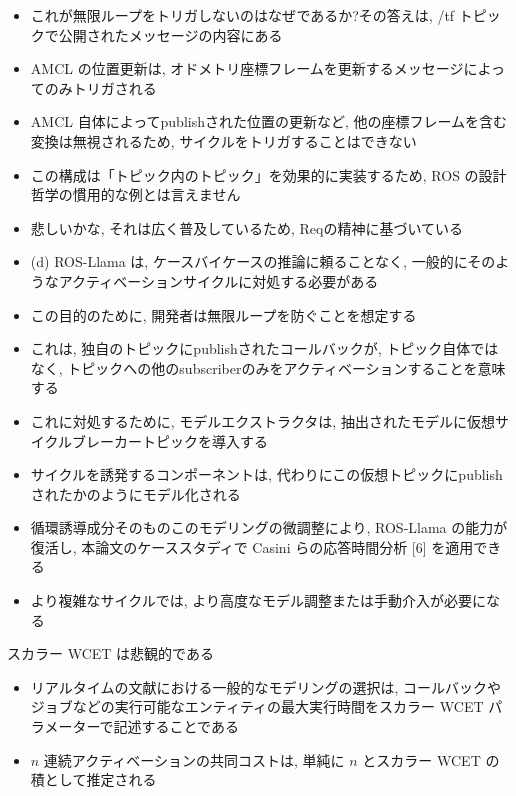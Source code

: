 \begin{frame}{}
    \begin{itemize}
        \item これが無限ループをトリガしないのはなぜであるか?その答えは, /tf トピックで公開されたメッセージの内容にある
\item AMCL の位置更新は, オドメトリ座標フレームを更新するメッセージによってのみトリガされる
\item AMCL 自体によってpublishされた位置の更新など, 他の座標フレームを含む変換は無視されるため, サイクルをトリガすることはできない
    \end{itemize}
\end{frame}

\begin{frame}{}
    \begin{itemize}
        \item この構成は「トピック内のトピック」を効果的に実装するため, ROS の設計哲学の慣用的な例とは言えません
\item 悲しいかな, それは広く普及しているため, Reqの精神に基づいている
\item (d) ROS-Llama は, ケースバイケースの推論に頼ることなく, 一般的にそのようなアクティベーションサイクルに対処する必要がある
\item この目的のために, 開発者は無限ループを防ぐことを想定する
\item これは, 独自のトピックにpublishされたコールバックが, トピック自体ではなく, トピックへの他のsubscriberのみをアクティベーションすることを意味する
    \end{itemize}
\end{frame}

\begin{frame}{}
    \begin{itemize}
        \item これに対処するために, モデルエクストラクタは, 抽出されたモデルに仮想サイクルブレーカートピックを導入する
\item サイクルを誘発するコンポーネントは, 代わりにこの仮想トピックにpublishされたかのようにモデル化される
\item 循環誘導成分そのものこのモデリングの微調整により, ROS-Llama の能力が復活し, 本論文のケーススタディで Casini らの応答時間分析 [6] を適用できる
\item より複雑なサイクルでは, より高度なモデル調整または手動介入が必要になる
    \end{itemize}
\end{frame}

\begin{frame}{スカラー WCET は悲観的である}
    \begin{itemize}
        \item リアルタイムの文献における一般的なモデリングの選択は, コールバックやジョブなどの実行可能なエンティティの最大実行時間をスカラー WCET パラメーターで記述することである
\item $n$ 連続アクティベーションの共同コストは, 単純に $n$ とスカラー WCET の積として推定される
    \end{itemize}
\end{frame}

